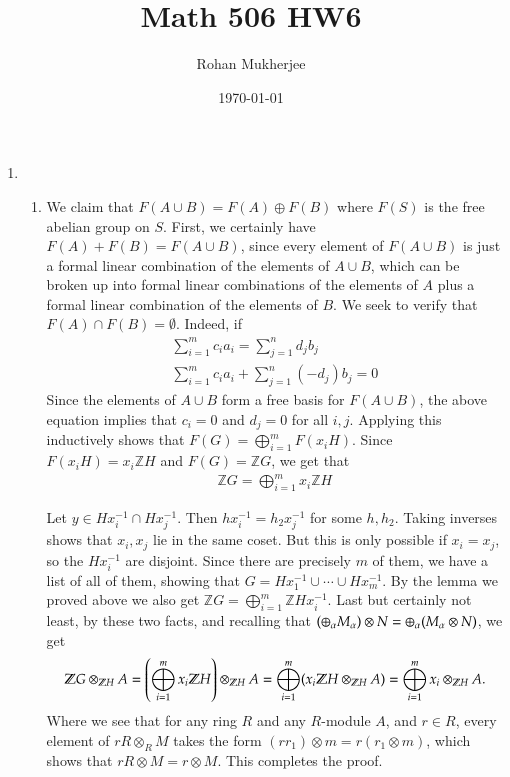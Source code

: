 \documentclass[12pt]{article}
\title{Math 506 HW6}
\date{\today}
\author{Rohan Mukherjee}
\theoremstyle{definitionstyle}
\def\mbb#1{\mathbb{#1}}
\newcommand{\Z}{\mbb Z}
\begin{document}
    \maketitle
    \begin{enumerate}
        \item \begin{enumerate}
            \item We claim that $F(A \cup B) = F(A) \oplus F(B)$ where $F(S)$ is the free abelian group on $S$. First, we certainly have $F(A) + F(B) = F(A \cup B)$, since every element of $F(A \cup B)$ is just a formal linear combination of the elements of $A \cup B$, which can be broken up into formal linear combinations of the elements of $A$ plus a formal linear combination of the elements of $B$. We seek to verify that $F(A) \cap F(B) = \emptyset$. Indeed, if
            \begin{align*}
                \sum_{i=1}^m c_i a_i = \sum_{j=1}^n d_jb_j \\
                \sum_{i=1}^m c_ia_i + \sum_{j=1}^n (-d_j)b_j = 0
            \end{align*}
            Since the elements of $A \cup B$ form a free basis for $F(A \cup B)$, the above equation implies that $c_i = 0$ and $d_j = 0$ for all $i,j$. Applying this inductively shows that $F(G) = \bigoplus_{i=1}^m F(x_iH)$. Since $F(x_iH) = x_i\Z H$ and $F(G) = \Z G$, we get that 
            \begin{align*}
                \Z G = \bigoplus_{i=1}^m x_i\Z H
            \end{align*}
            
            Let $y \in Hx_i^{-1} \cap Hx_j^{-1}$. Then $hx_i^{-1} = h_2x_j^{-1}$ for some $h, h_2$. Taking inverses shows that $x_i, x_j$ lie in the same coset. But this is only possible if $x_i = x_j$, so the $Hx_i^{-1}$ are disjoint. Since there are precisely $m$ of them, we have a list of all of them, showing that $G = Hx_1^{-1} \cup \cdots \cup Hx_m^{-1}$. By the lemma we proved above we also get $\Z G = \bigoplus_{i=1}^m \Z Hx_i^{-1}$. Last but certainly not least, by these two facts, and recalling that $\qty(\oplus_\alpha M_\alpha) \otimes N = \oplus_\alpha (M_\alpha \otimes N)$, we get
            \begin{align*}
                \Z G \otimes_{\Z H} A = \qty(\bigoplus_{i=1}^m x_i\Z H) \otimes_{\Z H} A = \bigoplus_{i=1}^m (x_i\Z H \otimes_{\Z H} A) = \bigoplus_{i=1}^m x_i \otimes_{\Z H} A.
            \end{align*}
            Where we see that for any ring $R$ and any $R$-module $A$, and $r \in R$, every element of $rR \otimes_R M$ takes the form $(rr_1) \otimes m = r(r_1 \otimes m)$, which shows that $rR \otimes M = r \otimes M$. This completes the proof.
    

\end{enumerate}
\end{enumerate}
\end{document}
